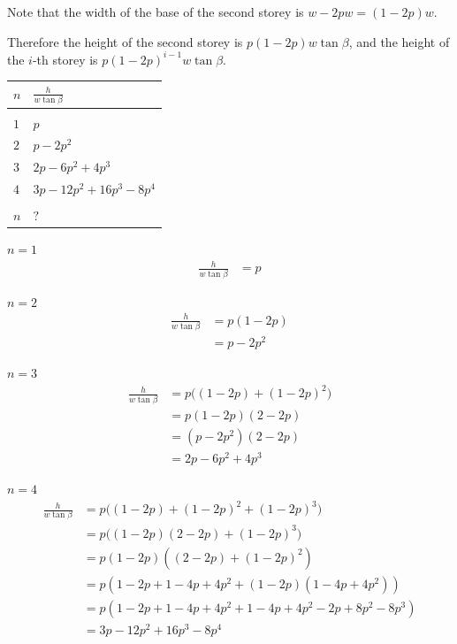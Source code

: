 \documentclass[12pt]{article}
\begin{document}
Note that the width of the base of the second storey is $w - 2pw = (1 - 2p)w$.

Therefore the height of the second storey is $p(1 - 2p)w\tan\beta$, and the height of the $i$-th
storey is $p(1 - 2p)^{i-1}w\tan\beta$.

\newpage

\begin{tabular}{l|l}
  $n$&$\frac{h}{w\tan\beta}$\\
  \hline\\
  $1$& $p$\\
  $2$& $p - 2p^2$\\
  $3$& $2p - 6p^2 + 4p^3$\\
  $4$& $3p - 12p^2 + 16p^3 - 8p^4$\\ \\
  $n$& $?$
\end{tabular}


$n = 1$
\begin{align*}
  \frac{h}{w\tan\beta}
  &= p
\end{align*}

$n = 2$
\begin{align*}
  \frac{h}{w\tan\beta}
  &= p(1 - 2p)\\
        &= p - 2p^2
\end{align*}

$n = 3$
\begin{align*}
  \frac{h}{w\tan\beta}
  &= p\Big((1 - 2p) + (1 - 2p)^2\Big)\\
  &= p(1 - 2p)(2 - 2p)\\
  &= (p - 2p^2)(2 - 2p)\\
  &= 2p - 6p^2 + 4p^3
\end{align*}

$n = 4$
\begin{align*}
  \frac{h}{w\tan\beta}
  &= p\Big((1 - 2p) + (1 - 2p)^2 + (1 - 2p)^3\Big)\\
  &= p\Big((1 - 2p)(2 - 2p) + (1 - 2p)^3\Big)\\
  &= p(1 - 2p)((2 - 2p) + (1 - 2p)^2)\\
  &= p(1 - 2p + 1 - 4p + 4p^2 + (1 - 2p)(1 - 4p + 4p^2))\\
  &= p(1 - 2p + 1 - 4p + 4p^2 + 1 - 4p + 4p^2 - 2p + 8p^2 - 8p^3)\\
  &= 3p - 12p^2 + 16p^3 - 8p^4\\
\end{align*}
\end{document}
